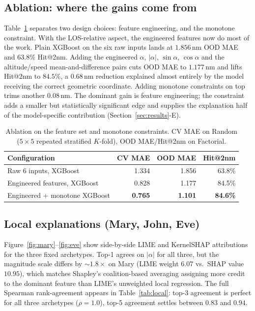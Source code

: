 \documentclass[conference]{IEEEtran}
\begin{document}
\subsection{Ablation: where the gains come from}
\label{subsec:ablation}
Table~\ref{tab:ablation} separates two design choices: feature engineering, and the monotone constraint. With the LOS-relative aspect, the engineered features now do most of the work. Plain XGBoost on the six raw inputs lands at $1.856$\,nm OOD MAE and $63.8\%$ Hit@2nm. Adding the engineered $\alpha$, $|\alpha|$, $\sin\alpha$, $\cos\alpha$ and the altitude/speed mean-and-difference pairs cuts OOD MAE to $1.177$\,nm and lifts Hit@2nm to $84.5\%$, a $0.68$\,nm reduction explained almost entirely by the model receiving the correct geometric coordinate. Adding monotone constraints on top trims another $0.08$\,nm. The dominant gain is feature engineering; the constraint adds a smaller but statistically significant edge and supplies the explanation half of the model-specific contribution (Section~\ref{sec:results}-E).

\begin{table}[t]
\centering
\caption{Ablation on the feature set and monotone constraints. CV MAE on Random ($5\times 5$ repeated stratified $K$-fold), OOD MAE/Hit@2nm on Factorial.}
\label{tab:ablation}
\scriptsize
\setlength{\tabcolsep}{4pt}
\begin{tabular}{lrrr}
\toprule
Configuration & CV MAE & OOD MAE & Hit@2nm \\
\midrule
Raw 6 inputs, XGBoost              & 1.334 & 1.856 & 63.8\% \\
Engineered features, XGBoost       & 0.828 & 1.177 & 84.5\% \\
Engineered + monotone XGBoost      & \textbf{0.765} & \textbf{1.101} & \textbf{84.6\%} \\
\bottomrule
\end{tabular}
\end{table}

\subsection{Local explanations (Mary, John, Eve)}
Figure~\ref{fig:mary}--\ref{fig:eve} show side-by-side LIME and KernelSHAP attributions for the three fixed archetypes. Top-1 agrees on $|\alpha|$ for all three, but the magnitude scale differs by $\sim 1.8\times$ on Mary (LIME weight $6.07$ vs.\ SHAP value $10.95$), which matches Shapley's coalition-based averaging assigning more credit to the dominant feature than LIME's unweighted local regression. The full Spearman rank-agreement appears in Table~\ref{tab:local}: top-3 agreement is perfect for all three archetypes ($\rho = 1.0$), top-5 agreement settles between $0.83$ and $0.94$.
\end{document}
